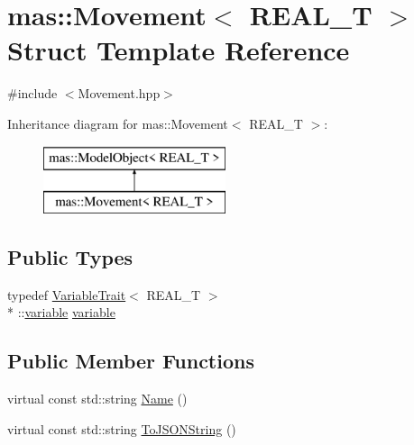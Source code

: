 \hypertarget{structmas_1_1_movement}{\section{mas\-:\-:Movement$<$ R\-E\-A\-L\-\_\-\-T $>$ Struct Template Reference}
\label{structmas_1_1_movement}
}


{\ttfamily \#include $<$Movement.\-hpp$>$}

Inheritance diagram for mas\-:\-:Movement$<$ R\-E\-A\-L\-\_\-\-T $>$\-:\begin{figure}[H]
\begin{center}
\leavevmode
\includegraphics[height=2.000000cm]{structmas_1_1_movement}
\end{center}
\end{figure}
\subsection*{Public Types}
\begin{DoxyCompactItemize}
\item 
typedef \hyperlink{structmas_1_1_variable_trait}{Variable\-Trait}$<$ R\-E\-A\-L\-\_\-\-T $>$\\*
\-::\hyperlink{structmas_1_1_movement_a4667a4bb2ad370d0cf6b476eb625288e}{variable} \hyperlink{structmas_1_1_movement_a4667a4bb2ad370d0cf6b476eb625288e}{variable}
\end{DoxyCompactItemize}
\subsection*{Public Member Functions}
\begin{DoxyCompactItemize}
\item 
virtual const std\-::string \hyperlink{structmas_1_1_movement_a59f6870b613e273f4d5521beb5710d88}{Name} ()
\item 
virtual const std\-::string \hyperlink{structmas_1_1_movement_a6ace5dba1349ee6fde5c242a467155d4}{To\-J\-S\-O\-N\-String} ()
\end{DoxyCompactItemize}
